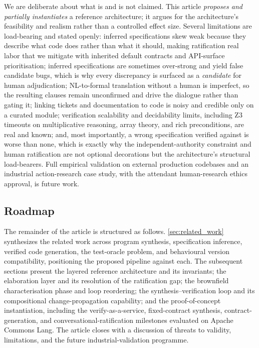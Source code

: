 We are deliberate about what is and is not claimed. This article \emph{proposes and partially instantiates} a reference architecture; it argues for the architecture's feasibility and realism rather than a controlled effect size. Several limitations are load-bearing and stated openly: inferred specifications skew weak because they describe what code does rather than what it should, making ratification real labor that we mitigate with inherited default contracts and API-surface prioritisation; inferred specifications are sometimes over-strong and yield false candidate bugs, which is why every discrepancy is surfaced as a \emph{candidate} for human adjudication; NL-to-formal translation without a human is imperfect, so the resulting clauses remain unconfirmed and drive the dialogue rather than gating it; linking tickets and documentation to code is noisy and credible only on a curated module; verification scalability and decidability limits, including Z3 timeouts on multiplicative reasoning, array theory, and rich preconditions, are real and known; and, most importantly, a wrong specification verified against is worse than none, which is exactly why the independent-authority constraint and human ratification are not optional decorations but the architecture's structural load-bearers. Full empirical validation on external production codebases and an industrial action-research case study, with the attendant human-research ethics approval, is future work.

\subsection{Roadmap}
\label{subsec:intro-roadmap}

The remainder of the article is structured as follows. \cref{sec:related_work} synthesizes the related work across program synthesis, specification inference, verified code generation, the test-oracle problem, and behavioural version compatibility, positioning the proposed pipeline against each. The subsequent sections present the layered reference architecture and its invariants; the elaboration layer and its resolution of the ratification gap; the brownfield characterisation phase and loop reordering; the synthesis--verification loop and its compositional change-propagation capability; and the proof-of-concept instantiation, including the verify-as-a-service, fixed-contract synthesis, contract-generation, and conversational-ratification milestones evaluated on Apache Commons Lang. The article closes with a discussion of threats to validity, limitations, and the future industrial-validation programme.
